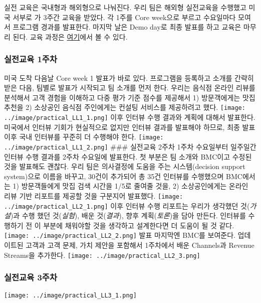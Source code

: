 \documentclass[
  letterpaper,
  DIV=11,
  numbers=noendperiod]{scrartcl}
\begin{document}
실전 교육은 국내형과 해외형으로 나눠진다. 우리 팀은 해외형 실전교육을
수행했고 미국 서부로 가 3주간 교육을 받았다. 각 1주를 Core week으로
부르고 수요일마다 모여서 프로그램 경과를 발표한다. 마지막 날은 Demo
day로 최종 발표를 하고 교육은 마무리 된다. 교육 과정은
\href{../file/KIC_UC_Berkeley_Syllabus_2022.docx}{여기}에서 볼 수 있다.

\hypertarget{uxc2e4uxc804uxad50uxc721-1uxc8fcuxcc28}{%
\subsubsection{실전교육
1주차}\label{uxc2e4uxc804uxad50uxc721-1uxc8fcuxcc28}}

미국 도착 다음날 Core week 1 발표가 바로 있다. 프로그램을 등록하고
소개를 간략히 받은 다음, 팀별로 발표가 시작되고 팀 소개를 먼저 한다.
우리는 음식점 온라인 리뷰를 분석해서 고객 경험을 이해하고 다중 평가 기준
점수를 제공해서 1) 방문객에게는 맛집 추천을 2) 소상공인 음식점
주인에게는 컨설팅 서비스를 제공하려고 했다.
\texttt{[image: ../image/practical\_LL1\_1.png]} 이후 인터뷰 수행 결과와
계획에 대해서 발표한다. 미국에서 인터뷰 기회가 현실적으로 없지만 인터뷰
결과를 발표해야 하므로, 최종 발표 이후 국내 인터뷰를 꾸준히 더 수행해야
한다. \texttt{[image: ../image/practical\_LL1\_2.png]} \#\#\# 실전교육
2주차 1주차 수요일부터 일주일간 인터뷰 수행 결과를 2주차 수요일에
발표한다. 첫 부분은 팀 소개와 BMC이고 수정된 것을 발표해도 괜찮다. 우리
팀은 의사결정에 도움을 주는 시스템(decision support system)으로 이름을
바꾸고, 30건이 추가되어 총 35건 인터뷰를 수행했으며 BMC에서는 1)
방문객들에게 맛집 검색 시간을 1/5로 줄여줄 것을, 2) 소상공인에게는
온라인 리뷰 기반 리포트를 제공할 것을 구분지어 발표했다.
\texttt{[image: ../image/practical\_LL2\_1.png]} 이후 인터뷰 수행 리포트는
우리가 생각했던 것(\emph{가설})과 수행 했던 것(\emph{실험}), 배운
것(\emph{결과}), 향후 계획(\emph{토론})을 담아 만든다. 인터뷰를 수행하기
전 이 부분에 채워야할 것을 생각하고 설계한다면 더 도움이 될 것 같다.
\texttt{[image: ../image/practical\_LL2\_2.png]} 발표 마지막엔 BMC를
보여준다. 업데이트된 고객과 고객 문제, 가치 제안을 포함해서 1주차에서
배운 Channels과 Revenue Streams을 추가한다.
\texttt{[image: ../image/practical\_LL2\_3.png]}

\hypertarget{uxc2e4uxc804uxad50uxc721-3uxc8fcuxcc28}{%
\subsubsection{실전교육
3주차}\label{uxc2e4uxc804uxad50uxc721-3uxc8fcuxcc28}}

\texttt{[image: ../image/practical\_LL3\_1.png]}
\end{document}
